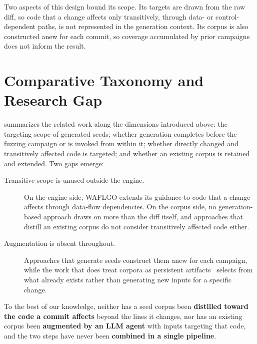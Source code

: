 Two aspects of this design bound its scope. Its targets are drawn from the raw
diff, so code that a change affects only transitively, through data- or
control-dependent paths, is not represented in the generation context. Its
corpus is also constructed anew for each commit, so coverage accumulated by
prior campaigns does not inform the result.

\section{Comparative Taxonomy and Research Gap}
\label{sec:rw-gap}
 summarizes the related work along the dimensions introduced above: the targeting scope of generated seeds; whether generation completes before the fuzzing campaign or is invoked from within it; whether directly changed and transitively affected code is targeted; and whether an existing corpus is retained and extended.
Two gaps emerge:
\begin{description}
  \item[Transitive scope is unused outside the engine.]
    On the engine side, WAFLGO extends its guidance to code that a change affects through data-flow dependencies.
    On the corpus side, no generation-based approach draws on more than the diff itself, and approaches that distill an existing corpus do not consider transitively affected code either.
  \item[Augmentation is absent throughout.]
    Approaches that generate seeds construct them anew for each campaign, while the work that does treat corpora as persistent artifacts~\cite{herreraSeedSelectionSuccessful2021, yooImprovingConfigurabilityUnitlevel2021, canakciTargetFuzzUsingDARTs2022, liImprovingSeedQuality2025} selects from what already exists rather than generating new inputs for a specific change.
\end{description}

\begin{tcolorbox}[colback=black!4, colframe=black!40, boxrule=0.4pt,
                  left=6pt, right=6pt, top=6pt, bottom=6pt]
To the best of our knowledge, neither has a seed corpus been \textbf{distilled toward the code a commit affects} beyond the lines it changes, nor has an existing corpus been \textbf{augmented by an LLM agent} with inputs targeting that code, and the two steps have never been \textbf{combined in a single pipeline}.
\end{tcolorbox}

